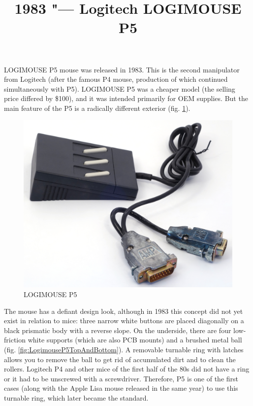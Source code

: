 \documentclass[11pt, a4paper]{article}
\begin{document}
\title{1983 "--- Logitech LOGIMOUSE P5}
\date{}
\maketitle
{}
LOGIMOUSE P5 mouse was released in 1983. This is the second manipulator from Logitech (after the famous  P4 mouse, production of which continued simultaneously with P5). LOGIMOUSE P5 was a cheaper model (the selling price differed by \$100), and it was intended primarily for OEM supplies. But the main feature of the P5 is a radically different exterior (fig. \ref{fig:LogimouseP5Pic}).

\begin{figure}[h]
   \centering
    \includegraphics[scale=0.37]{1983_logitech_logimouse_p5/pic_30.jpg}
    \caption{LOGIMOUSE P5}
    \label{fig:LogimouseP5Pic}
\end{figure}

The mouse has a defiant design look, although in 1983 this concept did not yet exist in relation to mice: three narrow white buttons are placed diagonally on a black prismatic body with a reverse slope. On the underside, there are four low-friction white supports (which are also PCB mounts) and a brushed metal ball (fig. \ref{fig:LogimouseP5TopAndBottom}). A removable turnable ring with latches allows you to remove the ball to get rid of accumulated dirt and to clean the rollers. Logitech P4 and other mice of the first half of the 80s did not have a ring or it had to be unscrewed with a screwdriver. Therefore, P5 is one of the first cases (along with the Apple Lisa mouse released in the same year) to use this turnable ring, which later became the standard.
\end{document}

